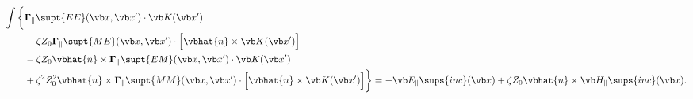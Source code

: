 \documentclass{article}
\begin{document}
\begin{enumerate}
\begin{align*}
       \int\bigg\{ &\BG_{\parallel}\supt{EE}(\vb x, \vb x^\prime) 
                   \cdot \vb K(\vb x^\prime)
                   \\
                   &-\zeta Z_0\BG_{\parallel}\supt{ME}(\vb x, \vb x^\prime)
                   \cdot \Big[\vbhat{n}\times \vb K(\vb x^\prime)\Big] 
                   \\
                   &-\zeta Z_0\vbhat{n}\times \BG_{\parallel}\supt{EM}(\vb x, \vb x^\prime) 
                   \cdot \vb K(\vb x^\prime)
                   \\
                   &+\zeta^2 Z_0^2
                   \vbhat{n}\times\BG_{\parallel}\supt{MM}(\vb x, \vb x^\prime)
                   \cdot \Big[\vbhat{n}\times \vb K(\vb x^\prime)\Big]
       \bigg\}
       = -\vb E_{\parallel}\sups{inc}(\vb x) 
            +\zeta Z_0 \vbhat{n}\times \vb H_{\parallel}\sups{inc}(\vb x).
       \end{align*}
\end{enumerate}
\end{document}
